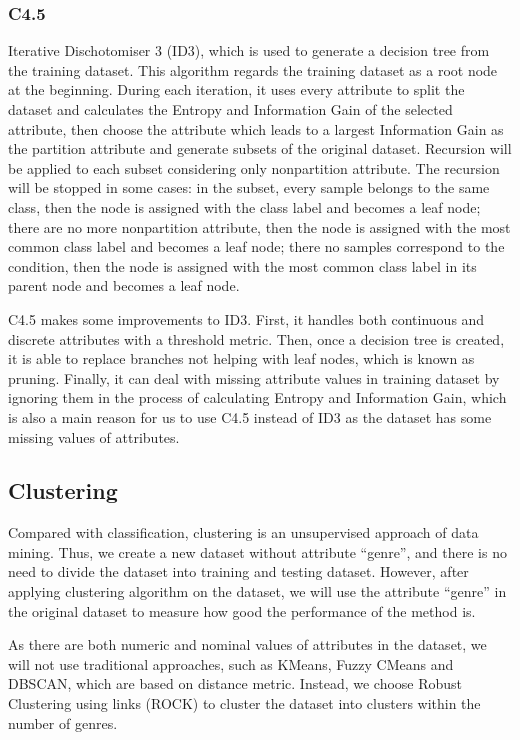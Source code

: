 \documentclass[conference]{IEEEtran}
\begin{document}
\subsubsection{C4.5}
Iterative Dischotomiser 3 (ID3), which is used to generate a decision tree from the training dataset. This algorithm regards the training dataset as a root node at the beginning. During each iteration, it uses every attribute to split the dataset and calculates the Entropy and Information Gain of the selected attribute, then choose the attribute which leads to a largest Information Gain as the partition attribute and generate subsets of the original dataset. Recursion will be applied to each subset considering only non­partition attribute. The recursion will be stopped in some cases: in the subset, every sample belongs to the same class, then the node is assigned with the class label and becomes a leaf node; there are no more non­partition attribute, then the node is assigned with the most common class label and becomes a leaf node; there no samples correspond to the condition, then the node is assigned with the most common class label in its parent node and becomes a leaf node\cite{Quinlan}. 

C4.5 makes some improvements to ID3. First, it handles both continuous and discrete attributes with a threshold metric. Then, once a decision tree is created, it is able to replace branches not helping with leaf nodes, which is known as pruning. Finally, it can deal with missing attribute values in training dataset by ignoring them in the process of calculating Entropy and Information Gain, which is also a main reason for us to use C4.5 instead of ID3 as the dataset has some missing values of attributes.

\subsection{Clustering}
Compared with classification, clustering is an unsupervised approach of data mining. Thus, we create a new dataset without attribute “genre”, and there is no need to divide the dataset into training and testing dataset. However, after applying clustering algorithm on the dataset, we will use the attribute “genre” in the original dataset to measure how good the performance of the method is.

As there are both numeric and nominal values of attributes in the dataset, we will not use traditional approaches, such as K­Means, Fuzzy C­Means and DBSCAN, which are based on distance metric. Instead, we choose Robust Clustering using links (ROCK) to cluster the dataset into clusters within the number of genres.
\end{document}
